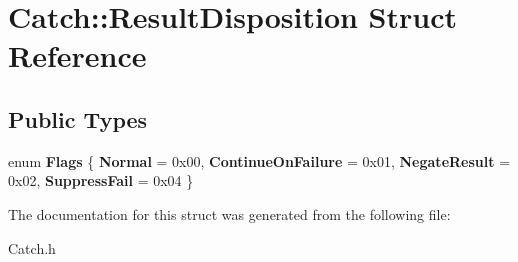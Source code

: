 \hypertarget{struct_catch_1_1_result_disposition}{\section{Catch\-:\-:Result\-Disposition Struct Reference}
\label{struct_catch_1_1_result_disposition}
}
\subsection*{Public Types}
\begin{DoxyCompactItemize}
\item 
enum {\bfseries Flags} \{ {\bfseries Normal} = 0x00, 
{\bfseries Continue\-On\-Failure} = 0x01, 
{\bfseries Negate\-Result} = 0x02, 
{\bfseries Suppress\-Fail} = 0x04
 \}
\end{DoxyCompactItemize}


The documentation for this struct was generated from the following file\-:\begin{DoxyCompactItemize}
\item 
Catch.\-h\end{DoxyCompactItemize}
